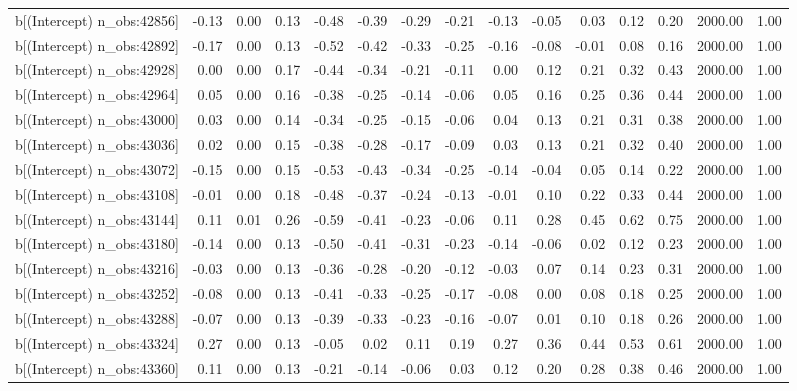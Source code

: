 \begin{table}[ht]
\begin{tabular}{rrrrrrrrrrrrrrr}
  b[(Intercept) n\_obs:42856] & -0.13 & 0.00 & 0.13 & -0.48 & -0.39 & -0.29 & -0.21 & -0.13 & -0.05 & 0.03 & 0.12 & 0.20 & 2000.00 & 1.00 \\ 
  b[(Intercept) n\_obs:42892] & -0.17 & 0.00 & 0.13 & -0.52 & -0.42 & -0.33 & -0.25 & -0.16 & -0.08 & -0.01 & 0.08 & 0.16 & 2000.00 & 1.00 \\ 
  b[(Intercept) n\_obs:42928] & 0.00 & 0.00 & 0.17 & -0.44 & -0.34 & -0.21 & -0.11 & 0.00 & 0.12 & 0.21 & 0.32 & 0.43 & 2000.00 & 1.00 \\ 
  b[(Intercept) n\_obs:42964] & 0.05 & 0.00 & 0.16 & -0.38 & -0.25 & -0.14 & -0.06 & 0.05 & 0.16 & 0.25 & 0.36 & 0.44 & 2000.00 & 1.00 \\ 
  b[(Intercept) n\_obs:43000] & 0.03 & 0.00 & 0.14 & -0.34 & -0.25 & -0.15 & -0.06 & 0.04 & 0.13 & 0.21 & 0.31 & 0.38 & 2000.00 & 1.00 \\ 
  b[(Intercept) n\_obs:43036] & 0.02 & 0.00 & 0.15 & -0.38 & -0.28 & -0.17 & -0.09 & 0.03 & 0.13 & 0.21 & 0.32 & 0.40 & 2000.00 & 1.00 \\ 
  b[(Intercept) n\_obs:43072] & -0.15 & 0.00 & 0.15 & -0.53 & -0.43 & -0.34 & -0.25 & -0.14 & -0.04 & 0.05 & 0.14 & 0.22 & 2000.00 & 1.00 \\ 
  b[(Intercept) n\_obs:43108] & -0.01 & 0.00 & 0.18 & -0.48 & -0.37 & -0.24 & -0.13 & -0.01 & 0.10 & 0.22 & 0.33 & 0.44 & 2000.00 & 1.00 \\ 
  b[(Intercept) n\_obs:43144] & 0.11 & 0.01 & 0.26 & -0.59 & -0.41 & -0.23 & -0.06 & 0.11 & 0.28 & 0.45 & 0.62 & 0.75 & 2000.00 & 1.00 \\ 
  b[(Intercept) n\_obs:43180] & -0.14 & 0.00 & 0.13 & -0.50 & -0.41 & -0.31 & -0.23 & -0.14 & -0.06 & 0.02 & 0.12 & 0.23 & 2000.00 & 1.00 \\ 
  b[(Intercept) n\_obs:43216] & -0.03 & 0.00 & 0.13 & -0.36 & -0.28 & -0.20 & -0.12 & -0.03 & 0.07 & 0.14 & 0.23 & 0.31 & 2000.00 & 1.00 \\ 
  b[(Intercept) n\_obs:43252] & -0.08 & 0.00 & 0.13 & -0.41 & -0.33 & -0.25 & -0.17 & -0.08 & 0.00 & 0.08 & 0.18 & 0.25 & 2000.00 & 1.00 \\ 
  b[(Intercept) n\_obs:43288] & -0.07 & 0.00 & 0.13 & -0.39 & -0.33 & -0.23 & -0.16 & -0.07 & 0.01 & 0.10 & 0.18 & 0.26 & 2000.00 & 1.00 \\ 
  b[(Intercept) n\_obs:43324] & 0.27 & 0.00 & 0.13 & -0.05 & 0.02 & 0.11 & 0.19 & 0.27 & 0.36 & 0.44 & 0.53 & 0.61 & 2000.00 & 1.00 \\ 
  b[(Intercept) n\_obs:43360] & 0.11 & 0.00 & 0.13 & -0.21 & -0.14 & -0.06 & 0.03 & 0.12 & 0.20 & 0.28 & 0.38 & 0.46 & 2000.00 & 1.00 \\ 

\end{tabular}
\end{table}
